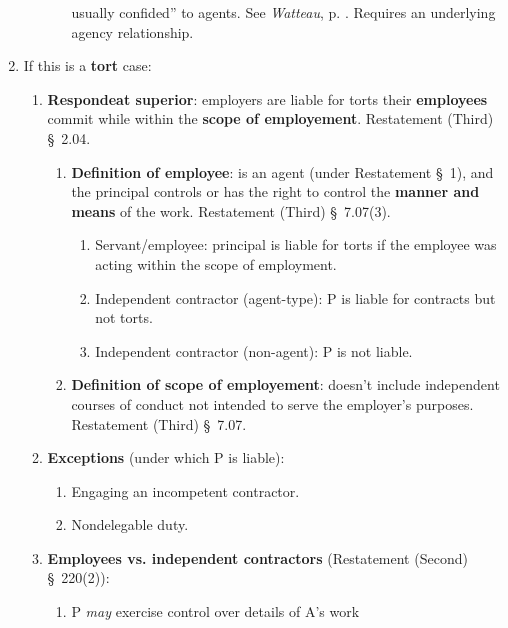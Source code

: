 \begin{enumerate}
\begin{enumerate}
\begin{enumerate}
            usually confided'' to agents. See \emph{Watteau}, p. 
            \pageref{par:watteau}. Requires an underlying agency 
            relationship.
        \end{enumerate}
    \end{enumerate}
    \item If this is a \textbf{tort} case:
    \begin{enumerate}
        \item \textbf{Respondeat superior}: employers are liable for torts 
        their \textbf{employees} commit while within the \textbf{scope of 
        employement}. Restatement (Third) \S\ 2.04.
        \begin{enumerate}
            \item \textbf{Definition of employee}: is an agent (under 
            Restatement \S\ 1), and the principal controls or has the right to 
            control the \textbf{manner and means} of the work. Restatement 
            (Third) \S\ 7.07(3).
            \begin{enumerate}
                \item Servant/employee: principal is liable for torts if the 
                employee was acting within the scope of employment.
                \item Independent contractor (agent-type): P is liable for 
                contracts but not torts.
                \item Independent contractor (non-agent): P is not liable.
            \end{enumerate}
            \item \textbf{Definition of scope of employement}: doesn't include 
            independent courses of conduct not intended to serve the 
            employer's purposes. Restatement (Third) \S\ 7.07.  
            \end{enumerate}
        \item \textbf{Exceptions} (under which P is liable):
        \begin{enumerate}
            \item Engaging an incompetent contractor.
            \item Nondelegable duty.
        \end{enumerate}
        \item \textbf{Employees vs. independent contractors} (Restatement 
        (Second) \S\ 220(2)):
        \begin{enumerate}
            \item P \emph{may} exercise control over details of A’s work

\end{enumerate}
\end{enumerate}
\end{enumerate}
